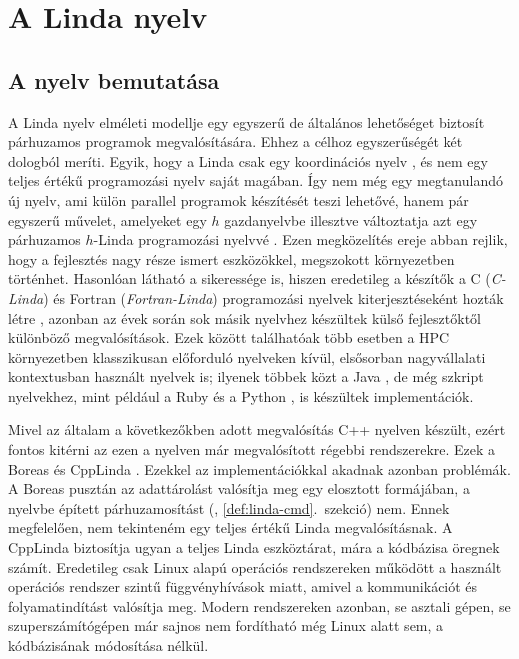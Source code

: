 \chapter{A Linda nyelv}\label{ch:linda}

\section{A nyelv bemutatása}

A Linda nyelv elméleti modellje egy egyszerű de általános lehetőséget biztosít párhuzamos programok megvalósítására.
Ehhez a célhoz egyszerűségét két dologból meríti.
Egyik, hogy a Linda  csak egy \un koordinációs nyelv \cite{morrison_wiki_2004}, és nem egy teljes értékű programozási nyelv saját magában.
Így nem még egy megtanulandó új nyelv, ami külön parallel programok készítését teszi lehetővé, hanem pár egyszerű művelet, amelyeket egy $h$ gazdanyelvbe illesztve változtatja azt egy párhuzamos $h$-Linda programozási nyelvvé \cite{ahuja_linda_1986}.
Ezen megközelítés ereje abban rejlik, hogy a fejlesztés nagy része ismert eszközökkel, megszokott környezetben történhet.
Hasonlóan látható a sikeressége is, hiszen eredetileg a készítők a C (\textit{C-Linda}) és Fortran (\textit{Fortran-Linda}) programozási nyelvek kiterjesztéseként hozták létre \cite{ahuja_linda_1986}, azonban az évek során sok másik nyelvhez készültek külső fejlesztőktől különböző megvalósítások.
Ezek között találhatóak több esetben a HPC környezetben klasszikusan előforduló nyelveken kívül, elsősorban nagyvállalati kontextusban használt nyelvek is; ilyenek többek közt a Java \cite{sun_microsystems_javaspaces_2011, lehman_hitting_2001}, de még szkript nyelvekhez, mint például a Ruby \cite[Part 3 -- Rinda]{seki_druby_nodate} és a Python \cite{andrew_wilkinson_pylinda_2007}, is készültek implementációk.

Mivel az általam a következőkben adott megvalósítás C++ nyelven készült, ezért fontos kitérni az ezen a nyelven már megvalósított régebbi rendszerekre.
Ezek a Boreas \cite{naval_aeriboreas_2024} és CppLinda \cite{thomas_arkadius_sluga_modern_2007}.
Ezekkel az implementációkkal akadnak azonban problémák.
A Boreas pusztán az adattárolást valósítja meg egy elosztott \ts{} formájában, a nyelvbe épített párhuzamosítást (\ld {}, \ref{def:linda-cmd}.~szekció) nem.
Ennek megfelelően, nem tekinteném egy teljes értékű Linda megvalósításnak.
A CppLinda biztosítja ugyan a teljes Linda eszköztárat, mára a kódbázisa öregnek számít.
Eredetileg csak Linux alapú operációs rendszereken működött a használt operációs rendszer szintű függvényhívások miatt, amivel a kommunikációt és folyamatindítást valósítja meg.
Modern rendszereken azonban, se asztali gépen, se szuperszámítógépen már sajnos nem fordítható még Linux alatt sem, a kódbázisának módosítása nélkül.

